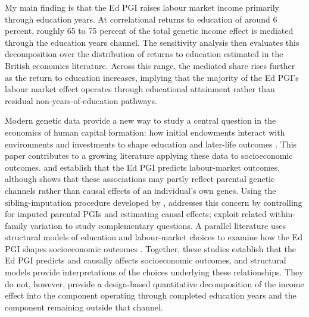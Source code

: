 My main finding is that the Ed PGI raises labour market income primarily through education years.
At correlational returns to education of around 6 percent, roughly 65 to 75 percent of the total genetic income effect is mediated through the education years channel.
The sensitivity analysis then evaluates this decomposition over the distribution of returns to education estimated in the British economics literature.
Across this range, the mediated share rises further as the return to education increases, implying that the majority of the Ed PGI's labour market effect operates through educational attainment rather than residual non-years-of-education pathways.

Modern genetic data provide a new way to study a central question in the economics of human capital formation: how initial endowments interact with environments and investments to shape education and later-life outcomes \citep{cunha2007technology,beauchamp2011moecular,biroli2025economics}.
This paper contributes to a growing literature applying these data to socioeconomic outcomes.
\cite{papageorge2020genes} and \cite{bryson2025gender} establish that the Ed PGI predicts labour-market outcomes, although \citet{schork2022indirect} shows that these associations may partly reflect parental genetic channels rather than causal effects of an individual's own genes.
Using the sibling-imputation procedure developed by \citet{young2022mendelian}, \citet{carvalho2024genetics} addresses this concern by controlling for imputed parental PGIs and estimating causal effects; \citet{muslimova2025environment,sanz2025sibling} exploit related within-family variation to study complementary questions.
A parallel literature uses structural models of education and labour-market choices to examine how the Ed PGI shapes socioeconomic outcomes \citep{barth2022genetic,houmark2024nurture,bolt2025genetic}.
Together, these studies establish that the Ed PGI predicts and causally affects socioeconomic outcomes, and structural models provide interpretations of the choices underlying these relationships.
They do not, however, provide a design-based quantitative decomposition of the income effect into the component operating through completed education years and the component remaining outside that channel.

